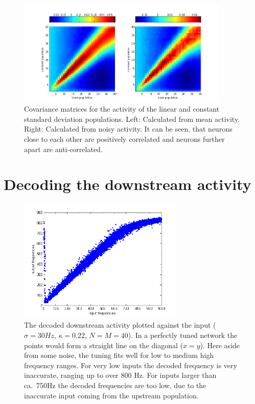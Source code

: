 \documentclass{scrartcl}
\begin{document}
\begin{figure}
\centering
\includegraphics[trim = {1cm 0 1cm 0.3cm}, width = 0.9\textwidth, clip]{../pics/cov}
\caption{Covariance matrices for the activity of the linear and constant standard deviation populations. Left: Calculated from mean activity. Right: Calculated from noisy activity. It can be seen, that neurons close to each other are positively correlated and neurons further apart are anti-correlated.}
\end{figure}
\clearpage

\section{Decoding the downstream activity}

\begin{figure}[h]
\centering
\includegraphics[trim = {0.7cm 0 0.5cm 0.2cm}, width = 0.7\textwidth, clip]{../pics/tuning}
\caption{The decoded downstream activity plotted against the input ($\sigma=30\si{Hz}$, $\kappa=0.22$, $N=M=40$). In a perfectly tuned network the points would form a straight line on the diagonal ($x=y$). Here aside from some noise, the tuning fits well for low to medium high frequency ranges. For very low inputs the decoded frequency is very inaccurate, ranging up to over 800 \si{Hz}. For inputs larger than ca.\ 750\si{Hz} the decoded frequencies are too low, due to the inaccurate input coming from the upstream population.}
\end{figure}
\end{document}
